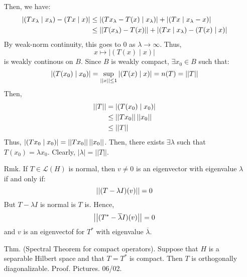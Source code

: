 \documentclass[12pt]{article}
\begin{document}
\begin{itemize}
    Then, we have:
    \begin{align*}
        |(Tx_\lambda \mid x_\lambda) -(Tx \mid x)| &\leq |(Tx_\lambda - T(x) \mid x_\lambda)| + |(Tx \mid x_\lambda - x)| \\
        &\leq \left\vert\left\vert T(x_\lambda)-T(x)\right\vert\right\vert + |(Tx \mid x_\lambda)-(T(x)\mid x)|
    \end{align*}
    By weak-norm continuity, this goes to $0$ as $\lambda \to \infty$. Thus, 
    \[ x \mapsto |(T(x) \mid x)|\]
    is weakly continous on $B$. Since $B$ is weakly compact, $\exists x_0 \in B$ such that:
    \[ |(T(x_0) \mid x_0)| = \sup_{\left\vert\left\vert x\right\vert\right\vert \leq 1} |(T(x) \mid x)| = n(T) = ||T||\]
    Then, 
    \begin{align*}
        \left\vert\left\vert T\right\vert\right\vert &= |(T(x_0) \mid x_0)| \\
        &\leq \left\vert\left\vert Tx_0\right\vert\right\vert\left\vert\left\vert x_0\right\vert\right\vert \\
        &\leq \left\vert\left\vert T\right\vert\right\vert
    \end{align*} 
    Thus, $|(Tx_0 \mid x_0)| = \left\vert\left\vert Tx_0\right\vert\right\vert\left\vert\left\vert x_0\right\vert\right\vert$. Then, there exists $\exists \lambda$ such that $T(x_0) = \lambda x_0$. Clearly, $|\lambda| = ||T||$.
    \item[Rmk.] If $T \in \mathcal{L}(H)$ is normal, then $v \neq 0$ is an eigenvector with eigenvalue $\lambda$ if and only if:
    \[\left\vert\left\vert(T-\lambda I)(v)\right\vert\right\vert = 0\]
    But $T-\lambda I$ is normal is $T$ is. Hence, 
    \[\left\vert\left\vert(T^*-\overline{\lambda}I)(v)\right\vert\right\vert = 0 \]
    and $v$ is an eigenvectof for $T^*$ with eigenvalue $\overline{\lambda}$.
    \item[Thm.] (Spectral Theorem for compact operators). Suppose that $H$ is a separable Hilbert space and that $T = T^*$ is compact. Then $T$ is orthogonally diagonalizable. \bbni
    Proof. Pictures. 06/02.
    
\end{itemize}
\end{document}
